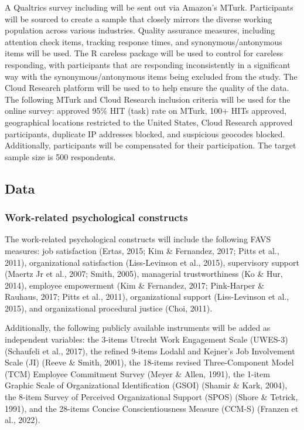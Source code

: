 \documentclass[
  man]{apa7}
\begin{document}
A Qualtrics survey including will be sent out via Amazon's MTurk. Participants will be sourced to create a sample that closely mirrors the diverse working population across various industries. Quality assurance measures, including attention check items, tracking response times, and synonymous/antonymous items will be used. The R careless package will be used to control for careless responding, with participants that are responding inconsistently in a significant way with the synonymous/antonymous items being excluded from the study. The Cloud Research platform will be used to to help ensure the quality of the data. The following MTurk and Cloud Research inclusion criteria will be used for the online survey: approved 95\% HIT (task) rate on MTurk, 100+ HITs approved, geographical locations restricted to the United States, Cloud Research approved participants, duplicate IP addresses blocked, and suspicious geocodes blocked. Additionally, participants will be compensated for their participation. The target sample size is 500 respondents.

\hypertarget{data-1}{%
\subsection{Data}\label{data-1}}

\hypertarget{work-related-psychological-constructs}{%
\subsubsection{Work-related psychological constructs}\label{work-related-psychological-constructs}}

The work-related psychological constructs will include the following FAVS measures: job satisfaction (Ertas, 2015; Kim \& Fernandez, 2017; Pitts et al., 2011), organizational satisfaction (Liss-Levinson et al., 2015), supervisory support (Maertz Jr et al., 2007; Smith, 2005), managerial trustworthiness (Ko \& Hur, 2014), employee empowerment (Kim \& Fernandez, 2017; Pink-Harper \& Rauhaus, 2017; Pitts et al., 2011), organizational support (Liss-Levinson et al., 2015), and organizational procedural justice (Choi, 2011).

Additionally, the following publicly available instruments will be added as independent variables: the 3-items Utrecht Work Engagement Scale (UWES-3) (Schaufeli et al., 2017), the refined 9-items Lodahl and Kejner's Job Involvement Scale (JI) (Reeve \& Smith, 2001), the 18-items revised Three-Component Model (TCM) Employee Commitment Survey (Meyer \& Allen, 1991), the 1-item Graphic Scale of Organizational Identification (GSOI) (Shamir \& Kark, 2004), the 8-item Survey of Perceived Organizational Support (SPOS) (Shore \& Tetrick, 1991), and the 28-items Concise Conscientiousness Measure (CCM-S) (Franzen et al., 2022).
\end{document}
